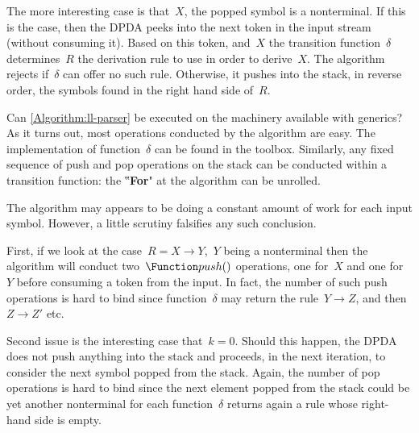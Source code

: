 The more interesting case is that~$X$, the popped symbol
  is a nonterminal.
If this is the case, then the DPDA peeks into the next token in the input
  stream (without consuming it).
Based on this token, and~$X$ the transition function~$δ$
  determines~$R$ the derivation rule to use in order to derive~$X$.
The algorithm rejects if~$δ$ can offer no such rule.
Otherwise, it pushes into the stack, in reverse order, the symbols
  found in the right hand side of~$R$.

Can \cref{Algorithm:ll-parser} be executed on the machinery
  available with \Java generics?
As it turns out, most operations conducted by the algorithm
  are easy.
The implementation of function~$δ$ can
  be found in the toolbox.
Similarly, any fixed sequence of push and pop
  operations on the stack can be conducted within a \Java
  transition function:
  the ‟\textbf{For}" at the algorithm can be unrolled.

The algorithm may appears to be doing a constant amount
  of work for each input symbol.
However, a little scrutiny falsifies any such conclusion.

First, if we look at the case~$R=X→Y$,~$Y$
  being a nonterminal then the algorithm will conduct two~$\Function push()$ operations,
  one for~$X$ and one for~$Y$ before consuming a token from the input.
In fact, the number of such push operations is hard to bind since function~$δ$ may
  return the rule~$Y→Z$, and then~$Z→Z'$ etc.

Second issue is the interesting case that~$k=0$.
Should this happen, the DPDA does not push anything into the stack
  and proceeds, in the next iteration, to consider the next symbol
  popped from the stack.
Again, the number of pop operations is hard to bind since the next element
  popped from the stack could be yet another nonterminal for each function~$δ$
  returns again a rule whose right-hand side is empty.

